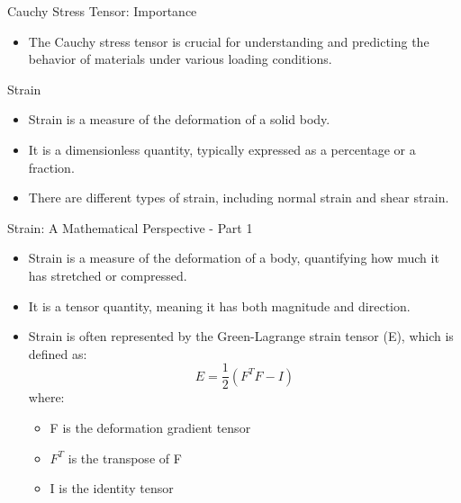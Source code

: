 \documentclass{beamer}
\begin{document}
\begin{frame}{Cauchy Stress Tensor: Importance}
    \begin{itemize}
        \item The Cauchy stress tensor is crucial for understanding and predicting the behavior of materials under various loading conditions.
    \end{itemize}
\end{frame}


\begin{frame}{Strain}
    \begin{itemize}
        \item Strain is a measure of the deformation of a solid body.
        \item It is a dimensionless quantity, typically expressed as a percentage or a fraction.
        \item There are different types of strain, including normal strain and shear strain.
    \end{itemize}
\end{frame}

\begin{frame}{Strain: A Mathematical Perspective - Part 1}
    \begin{itemize}
        \item Strain is a measure of the deformation of a body, quantifying how much it has stretched or compressed.
        \item It is a tensor quantity, meaning it has both magnitude and direction.
        \item Strain is often represented by the Green-Lagrange strain tensor (E), which is defined as:
        \begin{equation*}
        E = \frac{1}{2} (F^T F - I)
        \end{equation*}
        where:
        \begin{itemize}
            \item F is the deformation gradient tensor
            \item $F^T$ is the transpose of F
            \item I is the identity tensor
        \end{itemize}
    \end{itemize}
\end{frame}
\end{document}

